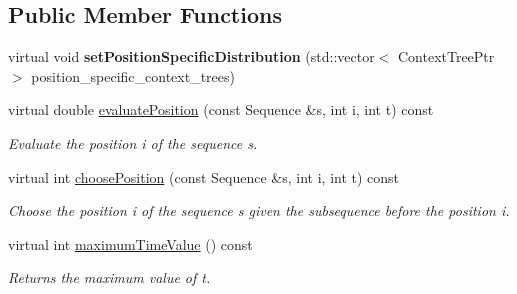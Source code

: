\subsection*{Public Member Functions}
\begin{DoxyCompactItemize}
\item 
\mbox{\label{classtops_1_1InhomogeneousMarkovChain_ad54564afb074212e4cf54eb8d53bca3a}} 
virtual void {\bfseries set\+Position\+Specific\+Distribution} (std\+::vector$<$ Context\+Tree\+Ptr $>$ position\+\_\+specific\+\_\+context\+\_\+trees)
\item 
\mbox{\label{classtops_1_1InhomogeneousMarkovChain_a7aebc92c4d85507eefe8b6a505fbe132}} 
virtual double \hyperlink{classtops_1_1InhomogeneousMarkovChain_a7aebc92c4d85507eefe8b6a505fbe132}{evaluate\+Position} (const Sequence \&s, int i, int t) const
\begin{DoxyCompactList}\small\item\em Evaluate the position i of the sequence s. \end{DoxyCompactList}\item 
\mbox{\label{classtops_1_1InhomogeneousMarkovChain_a55e36090a72a54118e439fe2e5add49b}} 
virtual int \hyperlink{classtops_1_1InhomogeneousMarkovChain_a55e36090a72a54118e439fe2e5add49b}{choose\+Position} (const Sequence \&s, int i, int t) const
\begin{DoxyCompactList}\small\item\em Choose the position i of the sequence s given the subsequence before the position i. \end{DoxyCompactList}\item 
\mbox{\label{classtops_1_1InhomogeneousMarkovChain_a7d9157f4bc965d715a851230351e9c76}} 
virtual int \hyperlink{classtops_1_1InhomogeneousMarkovChain_a7d9157f4bc965d715a851230351e9c76}{maximum\+Time\+Value} () const
\begin{DoxyCompactList}\small\item\em Returns the maximum value of t. \end{DoxyCompactList}\item 
\mbox{\label{classtops_1_1InhomogeneousMarkovChain_a442e4b53a0e21d7ea95668b7366e803f}} 

\end{DoxyCompactItemize}

